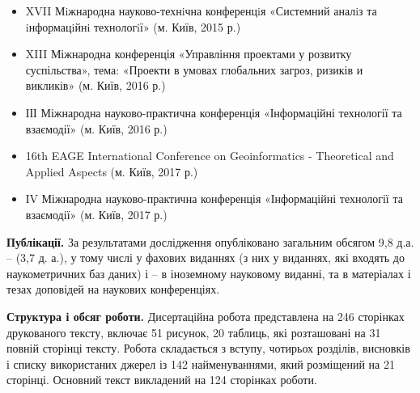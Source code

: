 \begin{itemize}
	\item XVII Мiжнародна науково-технiчна конференцiя «Системний аналiз та iнформацiйнi технологiї» (м. Київ, 2015 р.)
	\item XIII Міжнародна конференція «Управління проектами у розвитку суспільства», тема: «Проекти в умовах глобальних загроз, ризиків и викликів» (м. Київ, 2016 р.)
	\item ІІІ Міжнародна науково-практична конференція «Інформаційні технології та взаємодії» (м. Київ, 2016 р.)
	\item 16th EAGE International Conference on Geoinformatics - Theoretical and Applied Aspects (м. Київ, 2017 р.)
	\item ІV Міжнародна науково-практична конференція «Інформаційні технології та взаємодії» (м. Київ, 2017 р.)
\end{itemize}

\printbibliography[heading=countauthor, env=countauthor, keyword=biblioauthor, section=1]%
\printbibliography[heading=countauthorpaper, env=countauthorpaper, keyword=biblioauthor, notkeyword=biblioauthorconf, section=1]%
\printbibliography[heading=countauthorvak, env=countauthorvak, keyword=biblioauthorvak, section=1]%
\printbibliography[heading=countauthorindexed, env=countauthorindexed, keyword=biblioauthorvak, category=biblioauthoreng, section=1]%
\printbibliography[heading=countauthorconf, env=countauthorconf, keyword=biblioauthorconf, section=1]%
\printbibliography[heading=countauthornotvak, env=countauthornotvak, keyword=biblioauthornotvak, section=1]%
\printbibliography[heading=countauthoreng, env=countauthoreng, notkeyword=biblioauthorvak, category=biblioauthoreng, section=1]%

\textbf{Публікації.} 
За результатами дослідження опубліковано 
 загальним обсягом 9,8 д.а. – 
 (3,7 д. а.), у тому числі 
 у фахових виданнях (з них 
 у виданнях, які входять до наукометричних баз даних) і 
 – в іноземному науковому виданні, та 
 в матеріалах і тезах доповідей на наукових конференціях.

\ifsynopsis

\textbf{Структура і обсяг роботи.} Дисертаційна робота представлена на 246 сторінках друкованого тексту, включає 51 рисунок, 20 таблиць, які розташовані на 31 повній сторінці тексту. Робота складається з вступу, чотирьох розділів, висновків і списку використаних джерел із 142 найменуваннями, який розміщений на 21 сторінці. Основний текст викладений на 124 сторінках роботи.

